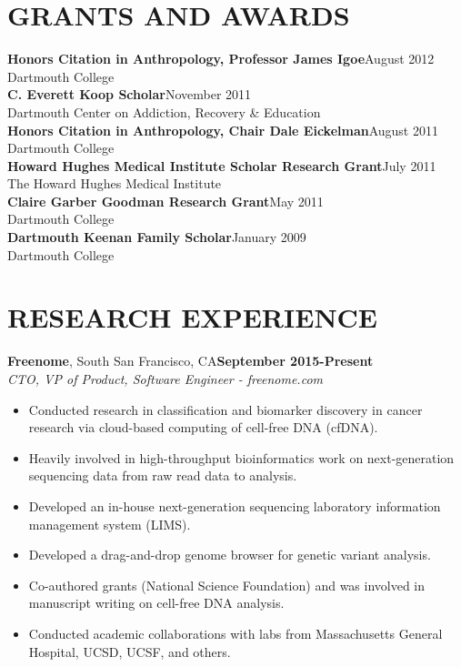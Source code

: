 \documentclass[a4paper, 12pt]{article}
\begin{document}
\section*{GRANTS AND AWARDS}
\vspace{-3mm}
{\bf Honors Citation in Anthropology, Professor James Igoe}\hfill August 2012\\
Dartmouth College\\[2mm]
{\bf C. Everett Koop Scholar}\hfill November 2011\\
Dartmouth Center on Addiction, Recovery \& Education\\[2mm]
{\bf Honors Citation in Anthropology, Chair Dale Eickelman}\hfill August 2011\\
Dartmouth College\\[2mm]
{\bf Howard Hughes Medical Institute Scholar Research Grant}\hfill July 2011\\
The Howard Hughes Medical Institute\\[2mm]
{\bf Claire Garber Goodman Research Grant}\hfill May 2011\\
Dartmouth College\\[2mm]
{\bf Dartmouth Keenan Family Scholar}\hfill January 2009\\
Dartmouth College

\section*{RESEARCH EXPERIENCE}
\vspace{-3mm}
{\bf Freenome}{, South San Francisco, CA}\hfill {\bf September 2015-Present \\}
{\sl CTO, VP of Product, Software Engineer - freenome.com} \\[-7mm]
\begin{itemize}[leftmargin=5mm]
\itemsep -2pt
	\item Conducted research in classification and biomarker discovery in cancer research via cloud-based computing of cell-free DNA (cfDNA).
	\item Heavily involved in high-throughput bioinformatics work on next-generation sequencing data from raw read data to analysis.
	\item Developed an in-house next-generation sequencing laboratory information management system (LIMS).
	\item Developed a drag-and-drop genome browser for genetic variant analysis.\\
	\item Co-authored grants (National Science Foundation) and was involved in manuscript writing on cell-free DNA analysis.
	\item Conducted academic collaborations with labs from Massachusetts General Hospital, UCSD, UCSF, and others.
\end{itemize}
                 
\end{document}
